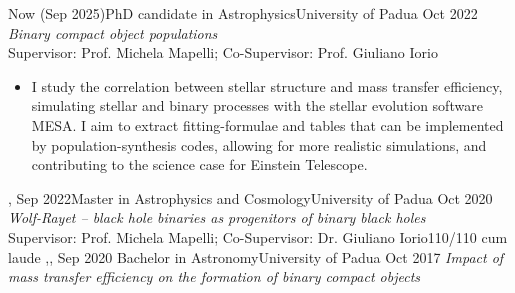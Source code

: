 %
%
%
\begin{experiences}
  \experiencetags
    {Now (Sep 2025)}{PhD candidate in Astrophysics}{University of Padua}
    {Oct 2022}
    {\textit{Binary compact object populations} \\
    Supervisor: Prof. Michela Mapelli; Co-Supervisor: Prof. Giuliano Iorio }{
    \begin{itemize}
        \item  I study the correlation between stellar structure and mass transfer efficiency, simulating stellar and binary processes with the stellar evolution software MESA. I aim to extract fitting-formulae and tables that can be implemented by population-synthesis codes, allowing for more realistic simulations, and contributing to the science case for Einstein Telescope.
    \end{itemize}
   }{,}
  \emptySeparator
  \experiencetagsend
    {Sep 2022}{Master in Astrophysics and Cosmology}{University of Padua}
    {Oct 2020} 
    {\textit{Wolf-Rayet -- black hole binaries as progenitors of binary black holes} \\
    Supervisor: Prof. Michela Mapelli; Co-Supervisor: Dr. Giuliano Iorio}{110/110 cum laude}
    {,,}
  \emptySeparator
  \experiencetagsend
    {Sep 2020}   {Bachelor in Astronomy}{University of Padua}
    {Oct 2017} 
    {\textit{Impact of mass transfer efficiency on the formation of binary compact objects} \\
}
\end{experiences}
